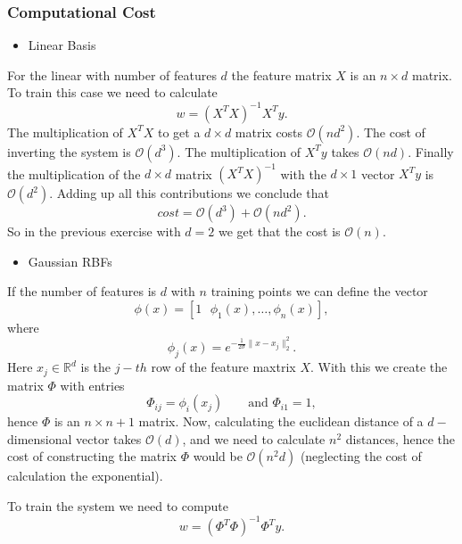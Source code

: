 \documentclass[11pt]{article}
\theoremstyle{plain}
\begin{document}
\subsubsection{Computational Cost}
\begin{itemize}
\item Linear Basis
\end{itemize}
For the linear with  number of features  $d$  the feature matrix $X$ is an $n\times d$
matrix. To train this case we need to calculate
\begin{equation*}
w=(X^{T}X)^{-1}X^{T}y.
\end{equation*}
The multiplication of $X^{T}X$ to get a $d\times d$ matrix costs $\mathcal{O}(nd^{2})$. The cost of 
inverting the system is  $\mathcal{O}(d^{3})$. The 
multiplication of $X^{T}y$ takes $\mathcal{O}(nd)$. Finally the multiplication of the $d\times d$
matrix  $(X^{T}X)^{-1}$ with
the $d\times 1$  vector $X^{T}y$  is  $\mathcal{O}(d^{2})$. Adding up all this contributions
we conclude that
\begin{equation*}
cost=\mathcal{O}(d^{3})+\mathcal{O}(nd^{2}).
\end{equation*}
So in the previous exercise with $d=2$ we get that the cost is $\mathcal{O}(n)$.
\begin{itemize}
\item Gaussian RBFs
\end{itemize}
If the number of features is $d$ with $n$ training points we can define the vector
\begin{equation*}
\phi(x)=[1\text{ } \phi_{1}(x),\ldots,\phi_{n}(x)],
\end{equation*}
where 
\begin{equation*}
\phi_{j}(x)=e^{-\frac{1}{2\sigma}\|x-x_{j}\|_{2}^{2}}.
\end{equation*}
Here $x_{j}\in\mathbb{R}^{d}$ is the $j-th$ row of the feature maxtrix $X$. With this we create the 
matrix $\Phi$ with entries
\begin{equation*}
\Phi_{ij}=\phi_{i}(x_{j})\qquad\text{and } \Phi_{i1}=1,
\end{equation*}
hence $\Phi$ is an $n\times n+1$ matrix. Now, calculating the euclidean distance of a $d-$ dimensional 
vector takes $\mathcal{O}(d)$, and we need to calculate $n^{2}$ distances, hence the cost of constructing
the matrix $\Phi$ would be $\mathcal{O}(n^{2}d)$ (neglecting the cost of calculation the exponential).

To train the system we need to compute
\begin{equation*}
w=(\Phi^{T}\Phi)^{-1}\Phi^{T}y.
\end{equation*}
\end{document}
